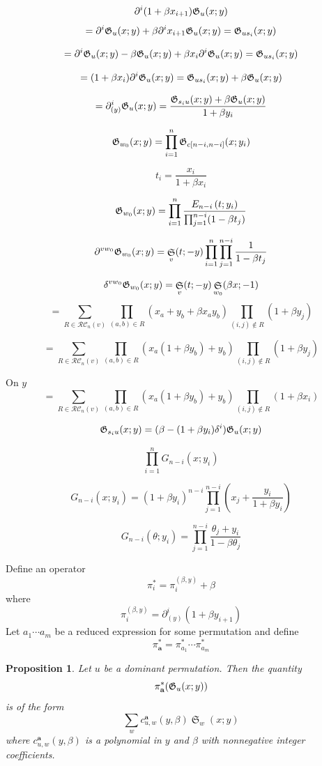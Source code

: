 \documentclass{amsart}
\newtheorem{proposition}[lemma]{Proposition}
\theoremstyle{definition}
\theoremstyle{remark}
\numberwithin{equation}{section}
\DeclareMathOperator{\sch}{\mathfrak{S}}
\begin{document}
$$\partial^i(1+\beta x_{i+1})\mathfrak G_u(x;y)$$
$$=\partial^i\mathfrak G_u(x;y) + \beta\partial^ix_{i+1}\mathfrak G_u(x;y)=\mathfrak G_{us_i}(x;y)$$

$$=\partial^i\mathfrak G_u(x;y) - \beta\mathfrak G_u(x;y) + \beta x_{i}\partial^i\mathfrak G_u(x;y)=\mathfrak G_{us_i}(x;y)$$

$$=(1+\beta x_{i})\partial^i\mathfrak G_u(x;y)=\mathfrak G_{us_i}(x;y) + \beta\mathfrak G_u(x;y)$$

$$=\partial^i_{(y)}\mathfrak G_u(x;y)=\frac{\mathfrak G_{s_iu}(x;y) + \beta\mathfrak G_u(x;y)}{1+\beta y_i}$$

$$\mathfrak G_{w_0}(x;y) = \prod_{i=1}^n \mathfrak G_{c[n-i,n-i]}(x;y_i)$$

$$t_i = \frac{x_i}{1+\beta x_i}$$

$$\mathfrak G_{w_0}(x;y) = \prod_{i=1}^n  \frac{E_{n-i}\left(t;y_i\right)}{\prod_{j=1}^{n-i}(1-\beta t_j)}$$

$$\partial^{vw_0}\groth_{w_0}(x;y) = \sch_v(t;-y)\prod_{i=1}^n\prod_{j=1}^{n-i}\frac{1}{1-\beta t_j}$$

$$\delta^{vw_0}\groth_{w_0}(x;y) = \sch_v(t;-y)\sch_{w_0}(\beta x;-1)$$
$$=\sum_{R\in \mathcal{RC}_n(v)}\prod_{(a,b)\in R}(x_a+y_b+\beta x_a y_b)\prod_{(i,j)\notin R}(1+\beta y_j)$$

$$=\sum_{R\in \mathcal{RC}_n(v)}\prod_{(a,b)\in R}(x_a(1+\beta y_b)+ y_b)\prod_{(i,j)\notin R}(1+\beta y_j)$$

On $y$
$$=\sum_{R\in \mathcal{RC}_n(v)}\prod_{(a,b)\in R}(x_a(1+\beta y_b)+ y_b)\prod_{(i,j)\notin R}(1+\beta x_i)$$

$$\mathfrak G_{s_iu}(x;y) = (\beta - (1+\beta y_i)\delta^i)\mathfrak G_u(x;y)$$

$$\prod_{i=1}^n G_{n-i}(x;y_i)$$

$$G_{n-i}(x;y_i) = (1+\beta y_i)^{n-i}\prod_{j=1}^{n-i}\left(x_j + \frac{y_i}{1+\beta y_i}\right)$$

$$G_{n-i}(\theta;y_i) = \prod_{j=1}^{n-i}\frac{\theta_j + y_i}{1-\beta \theta_j}$$

Define an operator
$$\pi_i^* = \pi_i^{(\beta,y)} + \beta$$
where 
$$\pi_i^{(\beta,y)} = \partial_{(y)}^i(1+\beta y_{i+1})$$
Let $a_1\cdots a_m$ be a reduced expression for some permutation and define
$$\pi^*_{\mathbf{a}} = \pi_{a_1}^*\cdots \pi_{a_m}^*$$
\begin{proposition}
Let $u$ be a dominant permutation. Then the quantity
$$\pi^*_{\mathbf{a}}(\mathfrak G_u(x;y))$$
is of the form
$$\sum_w c_{u,w}^{\mathbf{a}}(y,\beta)\sch_w(x;y)$$
where $c_{u,w}^{\mathbf{a}}(y,\beta)$ is a polynomial in $y$ and $\beta$ with nonnegative integer coefficients.
\end{proposition}
\end{document}
